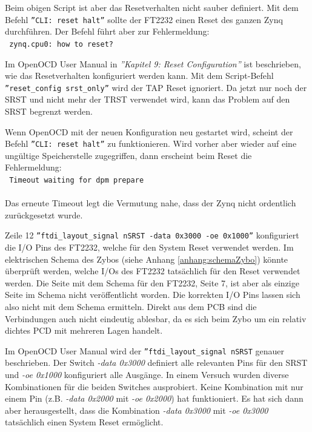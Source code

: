 Beim obigen Script ist aber das Resetverhalten nicht sauber definiert.
Mit dem Befehl \texttt{''CLI: reset halt''} sollte der FT2232 einen Reset des ganzen Zynq durchführen.
Der Befehl führt aber zur Fehlermeldung:\\
\texttt{
zynq.cpu0: how to reset?\\
}

Im OpenOCD User Manual\cite{bib:OpenOCDDoku} in \textit{''Kapitel 9: Reset Configuration''} ist beschrieben, wie das Resetverhalten konfiguriert werden kann.
Mit dem Script-Befehl \texttt{''reset\_config srst\_only''} wird der TAP Reset ignoriert.
Da jetzt nur noch der SRST und nicht mehr der TRST verwendet wird, kann das Problem auf den SRST begrenzt werden.

Wenn OpenOCD mit der neuen Konfiguration neu gestartet wird, scheint der Befehl \texttt{''CLI: reset halt''} zu funktionieren.
Wird vorher aber wieder auf eine ungültige Speicherstelle zugegriffen, dann erscheint beim Reset die Fehlermeldung:\\
\texttt{
Timeout waiting for dpm prepare\\
}\\
Das erneute Timeout legt die Vermutung nahe, dass der Zynq nicht ordentlich zurückgesetzt wurde.

Zeile 12 \texttt{''ftdi\_layout\_signal nSRST -data 0x3000 -oe 0x1000''} konfiguriert die I/O Pins des FT2232, welche für den System Reset verwendet werden.
Im elektrischen Schema des Zybos (siehe Anhang \ref{anhang:schemaZybo}) könnte überprüft werden, welche I/Os des FT2232 tatsächlich für den Reset verwendet werden.
Die Seite mit dem Schema für den FT2232, Seite 7, ist aber als einzige Seite im Schema nicht veröffentlicht worden.
Die korrekten I/O Pins lassen sich also nicht mit dem Schema ermitteln.
Direkt aus dem PCB sind die Verbindungen auch nicht eindeutig ablesbar, da es sich beim Zybo um ein relativ dichtes PCD mit mehreren Lagen handelt.

Im OpenOCD User Manual\cite{bib:OpenOCDDoku} wird der \texttt{''ftdi\_layout\_signal nSRST} genauer beschrieben.
Der Switch \textit{-data 0x3000} definiert alle relevanten Pins für den SRST und \textit{-oe 0x1000} konfiguriert alle Ausgänge.
In einem Versuch wurden diverse Kombinationen für die beiden Switches ausprobiert.
Keine Kombination mit nur einem Pin (z.B. \textit{-data 0x2000} mit \textit{-oe 0x2000}) hat funktioniert.
Es hat sich dann aber herausgestellt, dass die Kombination \textit{-data 0x3000} mit \textit{-oe 0x3000} tatsächlich einen System Reset ermöglicht.

